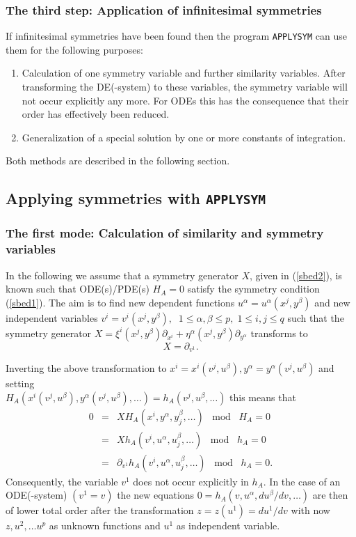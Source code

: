 \subsubsection{The third step: Application of infinitesimal symmetries}
If infinitesimal symmetries have been found then
the program \texttt{APPLYSYM} can use them for the following purposes:
\begin{enumerate}
\item Calculation of one symmetry variable and further similarity variables.
After transforming
the DE(-system) to these variables, the symmetry variable will not occur
explicitly any more. For ODEs this has the consequence that their order has
effectively been reduced.
\item Generalization of a special solution by one or more constants of
integration.
\end{enumerate}
Both methods are described in the following section.
\subsection{Applying symmetries with \texttt{APPLYSYM}}
\subsubsection{The first mode: Calculation of similarity and symmetry variables}
In the following we assume that a symmetry generator $X$, given
in (\ref{sbed2}), is known such that ODE(s)/PDE(s) $H_A=0$
satisfy the symmetry condition (\ref{sbed1}). The aim is to
find new dependent functions $u^\alpha = u^\alpha(x^j,y^\beta)$ and
new independent variables $v^i = v^i(x^j,y^\beta),\;\;
1\leq\alpha,\beta\leq p,\;1\leq i,j \leq q$
such that the symmetry generator
$X = \xi^i(x^j,y^\beta)\partial_{x^i} +
     \eta^\alpha(x^j,y^\beta)\partial_{y^\alpha}$
transforms to
\begin{equation}
X = \partial_{v^1}.    \label{sbed3}
\end{equation}

Inverting the above transformation to $x^i=x^i(v^j,u^\beta),
y^\alpha=y^\alpha(v^j,u^\beta)$ and setting \\
$H_A(x^i(v^j,u^\beta), y^\alpha(v^j,u^\beta),\ldots) =
h_A(v^j, u^\beta,\ldots)$
this means that
\begin{eqnarray*}
 0 & = & X H_A(x^i,y^\alpha,y^\beta_j,\ldots)\;\;\; \mbox{mod} \;\;\; H_A=0 \\
   & = & X h_A(v^i,u^\alpha,u^\beta_j,\ldots)\;\;\; \mbox{mod} \;\;\; h_A=0 \\
   & = & \partial_{v^1}h_A(v^i,u^\alpha,u^\beta_j,\ldots)\;\;\; \mbox{mod}
         \;\;\; h_A=0.
\end{eqnarray*}
Consequently, the variable $v^1$ does not occur explicitly in $h_A$.
In the case of an ODE(-system) $(v^1=v)$
the new equations $0=h_A(v,u^\alpha,du^\beta/dv,\ldots)$
are then of lower total order
after the transformation $z = z(u^1) = du^1/dv$ with now $z, u^2,\ldots u^p$
as unknown functions and $u^1$ as independent variable.

